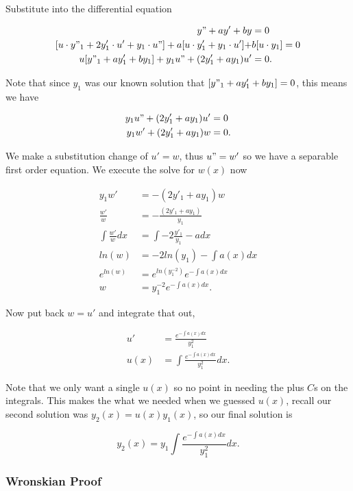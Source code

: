 \documentclass[12pt]{article}
\begin{document}
Substitute into the differential equation

\begin{align*}
    y"+ay'+by&=0 \\
    [u \cdot y"_1 + 2y'_1\cdot u' + y_1 \cdot u"] +a[u \cdot y'_1 + y_1 \cdot u'] + &b[u\cdot y_1] = 0 \\
    u[y"_1+ay'_1+by_1]+y_1u"+(2y'_1+ay_1)u'&=0.
\end{align*}

Note that since $y_1$ was our known solution that $[y"_1+ay'_1+by_1]=0$, this means we have

\begin{align*}
    y_1u"+(2y'_1+ay_1)u'&=0 \\
    y_1w'+(2y'_1+ay_1)w&=0.
\end{align*}

We make a substitution change of $u'=w$, thus $u"=w'$ so we have a separable first order equation. We execute the solve for $w(x)$ now

\begin{align*}
    y_1w' &= -(2y'_1+ay_1)w \\
    \frac{w'}{w} &= -\frac{(2y'_1+ay_1)}{y_1} \\
    \int \frac{w'}{w} dx &= \int -2\frac{y'_1}{y_1}-a dx \\
    ln(w) &= -2ln(y_1)- \int a(x) dx \\
    e^{ln(w)} &= e^{ln(y_1^{-2})} e^{-\int a(x) dx} \\
    w &= y_1^{-2}e^{-\int a(x) dx}.
\end{align*}

Now put back $w=u'$ and integrate that out, 

\begin{align*}
    u' &= \frac{e^{-\int a(x) dx}}{y_1^2} \\
    u(x) &= \int \frac{e^{-\int a(x) dx}}{y_1^2} dx.
\end{align*}

Note that we only want a single $u(x)$ so no point in needing the plus $C$s on the integrals. This makes the what we needed when we guessed $u(x)$, recall our second solution was $y_2(x)=u(x)y_1(x)$, so our final solution is

\begin{equation*}
    y_2(x)=y_1 \int \frac{e^{-\int a(x) dx}}{y_1^2} dx.
\end{equation*}


\subsubsection{Wronskian Proof}
\end{document}
